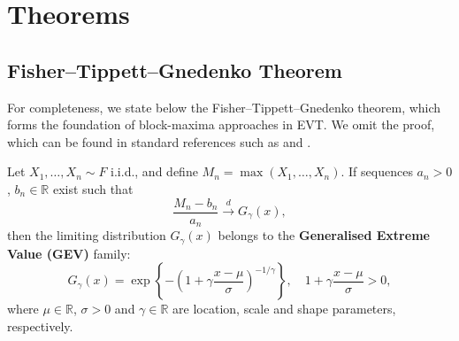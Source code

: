 \pagebreak

\section{Theorems}\label{sec:theorems}

\subsection{Fisher–Tippett–Gnedenko Theorem}\label{subsec:theorem_gev}
For completeness, we state below the Fisher–Tippett–Gnedenko theorem, which forms the foundation of block-maxima approaches in EVT. 
We omit the proof, which can be found in standard references such as 
\citet{gnedenko1943distribution} and \citet{Coles2001}.


\begin{theorem} \label{thm:gev}
Let \( X_1, \ldots, X_n \sim F \) i.i.d., and define \( M_n = \max(X_1, \ldots, X_n) \). 
If sequences \( {a_n} > 0 \), \( {b_n} \in \mathbb{R} \) exist such that
\begin{equation}
\frac{M_n - b_n}{a_n} \xrightarrow{d} G_\gamma(x),
\label{eqn:gev-limit}
\end{equation}
then the limiting distribution \( G_\gamma(x) \) belongs to the \textbf{Generalised Extreme Value (GEV)} family:
\begin{equation}
G_\gamma(x) = \exp\left\{ -\left(1 + \gamma \frac{x - \mu}{\sigma} \right)^{-1/\gamma} \right\}, 
\quad 1 + \gamma \frac{x - \mu}{\sigma} > 0,
\label{eqn:gev}
\end{equation}
where \( \mu \in \mathbb{R} \), \( \sigma > 0 \) and \( \gamma \in \mathbb{R} \) 
are location, scale and shape parameters, respectively.
\end{theorem}
